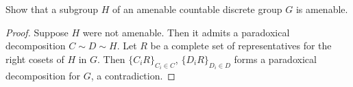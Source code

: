 \documentclass{article}
\begin{document}
 Show that a subgroup $H$ of an amenable countable discrete group $G$ is amenable.
\begin{proof}
Suppose $H$ were not amenable.  Then it admits a paradoxical decomposition $C \sim D \sim H$. Let $R$ be a complete set of representatives for the right cosets of $H$ in $G$. Then $\{C_iR\}_{C_i \in C}$, $\{D_iR\}_{D_i \in D}$ forms a paradoxical decomposition for $G$, a contradiction.
\end{proof}
\end{document}
